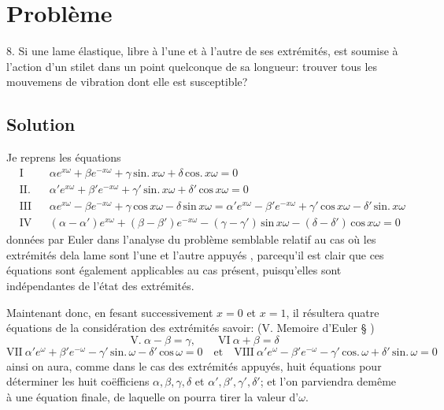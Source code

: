 \documentclass[11pt,a4paper]{article}
\begin{document}
\section{Problème}

8. Si une lame élastique, libre à l'une et à l'autre de ses extrémités,
est soumise à l'action d'un stilet dans un point quelconque de sa longueur:
trouver tous les mouvemens de vibration dont elle est susceptible?

\subsection{Solution}

Je reprens les équations
\begin{align*}
&\text{I} && \alpha e^{x\omega} + \beta e^{-x\omega} + \gamma\,\text{sin.}\,x\omega + \delta\,\text{cos.}\,x\omega = 0\\
&\text{II.} && \alpha' e^{x\omega} + \beta' e^{-x\omega} + \gamma'\,\text{sin.}\,x\omega + \delta'\,\text{cos}\,x\omega = 0\\
&\text{III} && \alpha e^{x\omega} - \beta e^{-x\omega} + \gamma\,\text{cos}\,x\omega - \delta\,\text{sin}\,x\omega = \alpha' e^{x\omega} - \beta' e^{-x\omega} + \gamma'\,\text{cos}\,x\omega - \delta'\,\text{sin.}\,x\omega\\
&\text{IV} && (\alpha-\alpha')e^{x\omega} + (\beta-\beta')e^{-x\omega} - (\gamma-\gamma')\,\text{sin}\,x\omega - (\delta-\delta')\,\text{cos}\,x\omega = 0
\end{align*}
données par Euler dans l'analyse du problème semblable relatif au cas où les
extrémités dela lame sont l'une et l'autre appuyés , parcequ'il est clair que ces équations
sont également applicables au cas présent, puisqu'elles sont indépendantes de l'état des
extrémités.


Maintenant donc, en fesant successivement $x = 0$ et $x = 1$, il résultera quatre équations
de la considération des extrémités savoir: (V. Memoire d'Euler § )
\[ \text{V.}\ \alpha - \beta = \gamma,\qquad \text{VI}\ \alpha + \beta = \delta \]
\[ \text{VII}\ \alpha' e^{\omega} + \beta' e^{-\omega} - \gamma'\,\text{sin.}\,\omega - \delta'\,\text{cos}\,\omega = 0 \quad\text{et}\quad \text{VIII}\ \alpha' e^{\omega} - \beta' e^{-\omega} - \gamma'\,\text{cos.}\,\omega + \delta'\,\text{sin.}\,\omega = 0 \]
ainsi on aura, comme dans le cas des extrémités appuyés, huit équations pour
déterminer les huit coëfficiens $\alpha, \beta, \gamma, \delta$ et $\alpha', \beta', \gamma', \delta'$; et l'on parviendra demême
à une équation finale, de laquelle on pourra tirer la valeur d'$\omega$.
\end{document}
